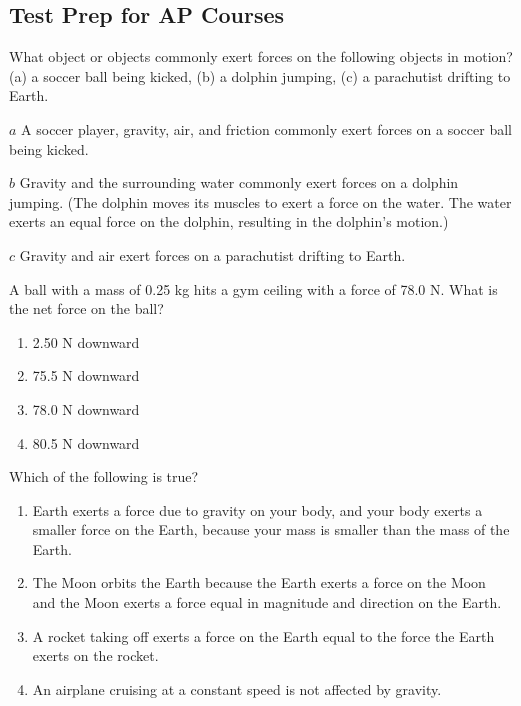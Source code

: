 \documentclass[
]{book}
\providecommand{\tightlist}{%
  \setlength{\itemsep}{0pt}\setlength{\parskip}{0pt}}
\newenvironment{ap-test-prep}{}{}
\begin{document}
\hypertarget{fs-id1635494}{}
\begin{ap-test-prep}

\hypertarget{test-prep-for-ap-courses-10}{%
\subsection{Test Prep for AP Courses}\label{test-prep-for-ap-courses-10}}

\hypertarget{fs-id1642858}{}
\leavevmode\hypertarget{fs-id1215685}{}%
What object or objects commonly exert forces on the following objects in
motion? (a) a soccer ball being kicked, (b) a dolphin jumping, (c) a
parachutist drifting to Earth.

\leavevmode\hypertarget{fs-id1692621}{}%
\(a\) A soccer player, gravity, air, and friction commonly exert forces
on a soccer ball being kicked.

\(b\) Gravity and the surrounding water commonly exert forces on a
dolphin jumping. (The dolphin moves its muscles to exert a force on the
water. The water exerts an equal force on the dolphin, resulting in the
dolphin's motion.)

\(c\) Gravity and air exert forces on a parachutist drifting to Earth.

\hypertarget{fs-id1681743}{}
\leavevmode\hypertarget{fs-id1439434}{}%
A ball with a mass of 0.25 kg hits a gym ceiling with a force of 78.0 N.
What is the net force on the ball?

\begin{enumerate}
\def\labelenumi{\alph{enumi}.}
\tightlist
\item
  2.50 N downward
\item
  75.5 N downward
\item
  78.0 N downward
\item
  80.5 N downward
\end{enumerate}

\hypertarget{fs-id1900456}{}
\leavevmode\hypertarget{fs-id1054770}{}%
Which of the following is true?

\begin{enumerate}
\def\labelenumi{\alph{enumi}.}
\tightlist
\item
  Earth exerts a force due to gravity on your body, and your body
  exerts a smaller force on the Earth, because your mass is smaller
  than the mass of the Earth.
\item
  The Moon orbits the Earth because the Earth exerts a force on the
  Moon and the Moon exerts a force equal in magnitude and direction on
  the Earth.
\item
  A rocket taking off exerts a force on the Earth equal to the force
  the Earth exerts on the rocket.
\item
  An airplane cruising at a constant speed is not affected by gravity.
\end{enumerate}


\end{ap-test-prep}
\end{document}

